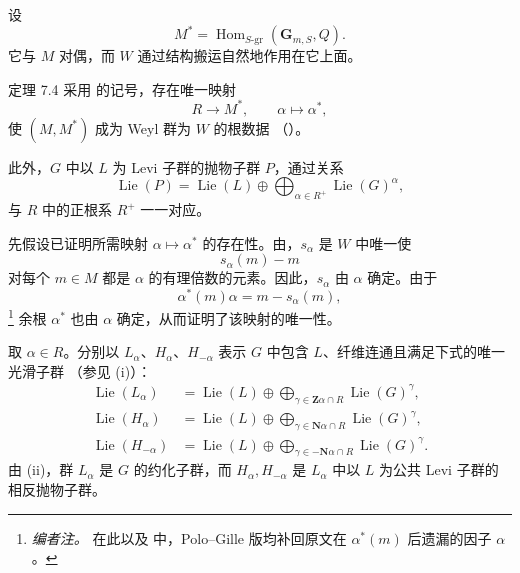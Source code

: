 设
\[
 M^*=\operatorname{Hom}_{S\text{-}\mathrm{gr}}
       (\mathbf G_{m,S},Q).
\]
它与 \(M\) 对偶，而 \(W\) 通过结构搬运自然地作用在它上面。

\begin{sgastatement}{定理 7.4}
采用  的记号，存在唯一映射
\[
 R\longrightarrow M^*,\qquad \alpha\longmapsto\alpha^*,
\]
使 \((M,M^*)\) 成为 Weyl 群为 \(W\) 的根数据 \textup{（）}。

此外，\(G\) 中以 \(L\) 为 Levi 子群的抛物子群 \(P\)，通过关系
\[
 \operatorname{Lie}(P)
 =\operatorname{Lie}(L)
  \oplus\bigoplus_{\alpha\in R^+}\operatorname{Lie}(G)^\alpha,
\]
与 \(R\) 中的正根系 \(R^+\) 一一对应。
\end{sgastatement}


先假设已证明所需映射 \(\alpha\mapsto\alpha^*\) 的存在性。由，\(s_\alpha\) 是 \(W\) 中唯一使
\[
 s_\alpha(m)-m
\]
对每个 \(m\in M\) 都是 \(\alpha\) 的有理倍数的元素。因此，\(s_\alpha\) 由 \(\alpha\) 确定。由于
\[
 \alpha^*(m)\alpha=m-s_\alpha(m),
\]
\footnote{\emph{编者注。} 在此以及  中，Polo--Gille 版均补回原文在 \(\alpha^*(m)\) 后遗漏的因子 \(\alpha\)。}
余根 \(\alpha^*\) 也由 \(\alpha\) 确定，从而证明了该映射的唯一性。


取 \(\alpha\in R\)。分别以 \(L_\alpha\)、\(H_\alpha\)、\(H_{-\alpha}\) 表示 \(G\) 中包含 \(L\)、纤维连通且满足下式的唯一光滑子群 \textup{（参见 \textup{(i)}）}：
\[
\begin{aligned}
 \operatorname{Lie}(L_\alpha)
  &=\operatorname{Lie}(L)
    \oplus\bigoplus_{\gamma\in\mathbf Z\alpha\cap R}
       \operatorname{Lie}(G)^\gamma,\\
 \operatorname{Lie}(H_\alpha)
  &=\operatorname{Lie}(L)
    \oplus\bigoplus_{\gamma\in\mathbf N\alpha\cap R}
       \operatorname{Lie}(G)^\gamma,\\
 \operatorname{Lie}(H_{-\alpha})
  &=\operatorname{Lie}(L)
    \oplus\bigoplus_{\gamma\in-\mathbf N\alpha\cap R}
       \operatorname{Lie}(G)^\gamma.
\end{aligned}
\]
由 \textup{(ii)}，群 \(L_\alpha\) 是 \(G\) 的约化子群，而 \(H_\alpha,H_{-\alpha}\) 是 \(L_\alpha\) 中以 \(L\) 为公共 Levi 子群的相反抛物子群。

